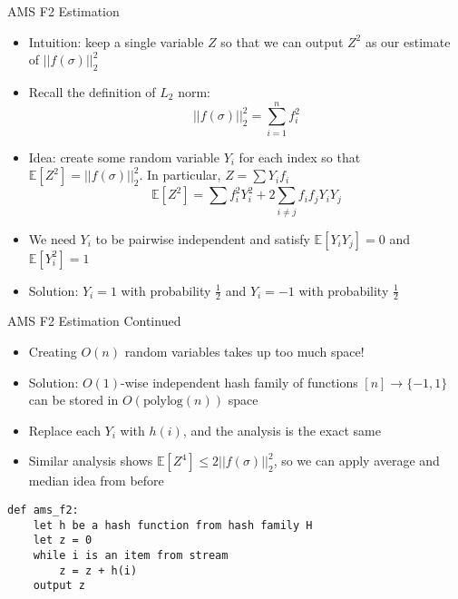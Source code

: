 \begin{frame}{AMS F2 Estimation}
\protect\hypertarget{ams-f2-estimation}{}
\begin{itemize}
\tightlist
\item
  Intuition: keep a single variable \(Z\) so that we can output \(Z^2\)
  as our estimate of \(||f(\sigma)||_2^2\)
\item
  Recall the definition of \(L_2\) norm:
  \[||f(\sigma)||_2^2 = \sum_{i=1}^n f_i^2\]
\item
  Idea: create some random variable \(Y_i\) for each index so that
  \(\mathbb{E}[Z^2] = ||f(\sigma)||_2^2\). In particular,
  \(Z = \sum Y_i f_i\)
  \[ \mathbb{E}[Z^2] = \sum f_i^2 Y_i^2 + 2\sum_{i \neq j} f_i f_j Y_i Y_j\]
\item
  We need \(Y_i\) to be pairwise independent and satisfy
  \(\mathbb{E}[Y_iY_j] = 0\) and \(\mathbb{E}[Y_i^2] = 1\)
\item
  Solution: \(Y_i = 1\) with probability \(\frac{1}{2}\) and
  \(Y_i = -1\) with probability \(\frac{1}{2}\)
\end{itemize}
\end{frame}

\begin{frame}[fragile]{AMS F2 Estimation Continued}
\protect\hypertarget{ams-f2-estimation-continued}{}
\begin{itemize}
\tightlist
\item
  Creating \(O(n)\) random variables takes up too much space!
\item
  Solution: \(O(1)\)-wise independent hash family of functions
  \([n] \to \{-1,1\}\) can be stored in \(O(\text{polylog}(n))\) space
\item
  Replace each \(Y_i\) with \(h(i)\), and the analysis is the exact same
\item
  Similar analysis shows \(\mathbb{E}[Z^4] \leq 2||f(\sigma)||_2^2\), so
  we can apply average and median idea from before
\end{itemize}

\begin{verbatim}
def ams_f2:
    let h be a hash function from hash family H
    let z = 0
    while i is an item from stream
        z = z + h(i)
    output z
\end{verbatim}
\end{frame}

